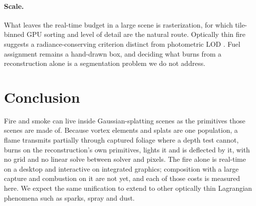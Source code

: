 \documentclass[acmtog,nonacm]{acmart}
\begin{document}
\paragraph{Scale.} What leaves the real-time budget in a large scene is rasterization, for which tile-binned GPU sorting and level of detail are the natural route. Optically thin fire suggests a radiance-conserving criterion distinct from photometric LOD \cite{kerbl2024}. Fuel assignment remains a hand-drawn box, and deciding what burns from a reconstruction alone is a segmentation problem we do not address.

\section{Conclusion}
Fire and smoke can live inside Gaussian-splatting scenes as the primitives those scenes are made of. Because vortex elements and splats are one population, a flame transmits partially through captured foliage where a depth test cannot, burns on the reconstruction's own primitives, lights it and is deflected by it, with no grid and no linear solve between solver and pixels. The fire alone is real-time on a desktop and interactive on integrated graphics; composition with a large capture and combustion on it are not yet, and each of those costs is measured here. We expect the same unification to extend to other optically thin Lagrangian phenomena such as sparks, spray and dust.



\end{document}

